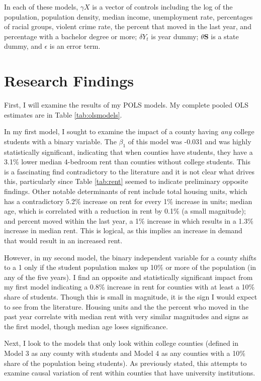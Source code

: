 \documentclass[12pt,english]{article}
\begin{document}
In each of these models, \(\gamma X\) is a vector of controls including the log of the
population, population density, median income, unemployment rate,
percentages of racial groups, violent crime rate, the percent that moved
in the last year, and percentage with a bachelor degree or more;
\(\delta Y_t\) is year dummy; \(\theta\boldsymbol{S}\) is a state dummy,
and \(\epsilon\) is an error term.

\section{Research Findings}\label{sec:results}

First, I will examine the results of my POLS models. My complete pooled OLS estimates are in Table \ref{tab:olsmodels}.

In my first model, I sought to examine the impact of a county having \textit{any} college students with a binary variable. The $\beta_1$ of this model was -0.031 and was highly statistically significant, indicating that when counties have students, they have a 3.1\% lower median 4-bedroom rent than counties without college students. This is a fascinating find contradictory to the literature and it is not clear what drives this, particularly since Table \ref{tab:rent} seemed to indicate preliminary opposite findings. Other notable determinants of rent include total housing units, which has a contradictory 5.2\% increase on rent for every 1\% increase in units; median age, which is correlated with a reduction in rent by 0.1\% (a small magnitude); and percent moved within the last year, a 1\% increase in which results in a 1.3\% increase in median rent. This is logical, as this implies an increase in demand that would result in an increased rent.  

However, in my second model, the binary independent variable for a county shifts to a 1 only if the student population makes up 10\% or more of the population (in any of the five years). I find an opposite and statistically significant impact from my first model indicating a 0.8\% increase in rent for counties with at least a 10\% share of students. Though this is small in magnitude, it is the sign I would expect to see from the literature. Housing units and the the percent who moved in the past year correlate with median rent with very similar magnitudes and signs as the first model, though median age loses significance. 

Next, I look to the models that only look within college counties (defined in Model 3 as any county with students and Model 4 as any counties with a 10\% share of the population being students). As previously stated, this attempts to examine causal variation of rent within counties that have university institutions. 
\end{document}
